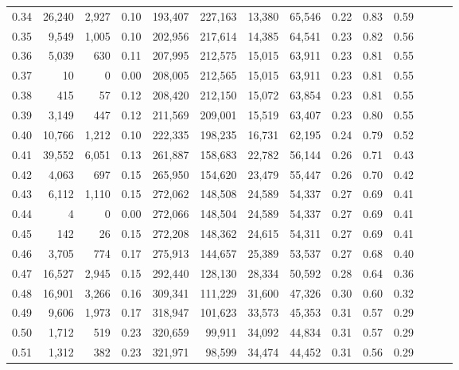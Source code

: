 \begin{tabular}{rrrrrrrrrrrrrr}
0.34 &  26,240 &  2,927 &  0.10 &  193,407 &  227,163 &  13,380 &  65,546 &  0.22 &  0.83 &      0.59 \\
0.35 &   9,549 &  1,005 &  0.10 &  202,956 &  217,614 &  14,385 &  64,541 &  0.23 &  0.82 &      0.56 \\
0.36 &   5,039 &    630 &  0.11 &  207,995 &  212,575 &  15,015 &  63,911 &  0.23 &  0.81 &      0.55 \\
0.37 &      10 &      0 &  0.00 &  208,005 &  212,565 &  15,015 &  63,911 &  0.23 &  0.81 &      0.55 \\
0.38 &     415 &     57 &  0.12 &  208,420 &  212,150 &  15,072 &  63,854 &  0.23 &  0.81 &      0.55 \\
0.39 &   3,149 &    447 &  0.12 &  211,569 &  209,001 &  15,519 &  63,407 &  0.23 &  0.80 &      0.55 \\
0.40 &  10,766 &  1,212 &  0.10 &  222,335 &  198,235 &  16,731 &  62,195 &  0.24 &  0.79 &      0.52 \\
0.41 &  39,552 &  6,051 &  0.13 &  261,887 &  158,683 &  22,782 &  56,144 &  0.26 &  0.71 &      0.43 \\
0.42 &   4,063 &    697 &  0.15 &  265,950 &  154,620 &  23,479 &  55,447 &  0.26 &  0.70 &      0.42 \\
0.43 &   6,112 &  1,110 &  0.15 &  272,062 &  148,508 &  24,589 &  54,337 &  0.27 &  0.69 &      0.41 \\
0.44 &       4 &      0 &  0.00 &  272,066 &  148,504 &  24,589 &  54,337 &  0.27 &  0.69 &      0.41 \\
0.45 &     142 &     26 &  0.15 &  272,208 &  148,362 &  24,615 &  54,311 &  0.27 &  0.69 &      0.41 \\
0.46 &   3,705 &    774 &  0.17 &  275,913 &  144,657 &  25,389 &  53,537 &  0.27 &  0.68 &      0.40 \\
0.47 &  16,527 &  2,945 &  0.15 &  292,440 &  128,130 &  28,334 &  50,592 &  0.28 &  0.64 &      0.36 \\
0.48 &  16,901 &  3,266 &  0.16 &  309,341 &  111,229 &  31,600 &  47,326 &  0.30 &  0.60 &      0.32 \\
0.49 &   9,606 &  1,973 &  0.17 &  318,947 &  101,623 &  33,573 &  45,353 &  0.31 &  0.57 &      0.29 \\
0.50 &   1,712 &    519 &  0.23 &  320,659 &   99,911 &  34,092 &  44,834 &  0.31 &  0.57 &      0.29 \\
0.51 &   1,312 &    382 &  0.23 &  321,971 &   98,599 &  34,474 &  44,452 &  0.31 &  0.56 &      0.29 \\

\end{tabular}
